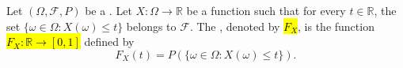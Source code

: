 \begin{definition} \label{definition:cumulative_distribution_function_of_a_real_valued_random_variable_on_a_probability_space}
Let $(\Omega, \mathcal{F}, P)$ be a . Let $X: \Omega \to \mathbb{R}$ be a function such that for every $t \in \mathbb{R}$, the set $\{\omega \in \Omega : X(\omega) \leq t\}$ belongs to $\mathcal{F}$. The , denoted by \hl{$F_X$}, is the function \hl{$F_X: \mathbb{R} \to [0, 1]$} defined by
$$F_X(t) = P(\{\omega \in \Omega : X(\omega) \leq t\}).$$
\end{definition}